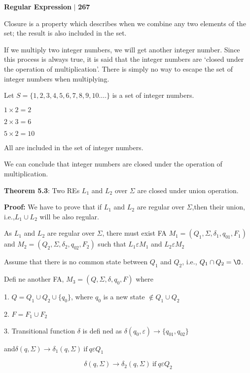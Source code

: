 \documentclass[10pt,a4paper]{book}
\begin{document}
\small

\begin{flushright}
  \textsf{\textbf{Regular Expression}} $|$ \textbf{\textsf{267}}
\end{flushright}

Closure is a property which describes when we combine any two elements of the set; the result is
also included in the set.

If we multiply two integer numbers, we will get another integer number. Since this process is always
true, it is said that the integer numbers are ‘closed under the operation of multiplication’. There is simply
no way to escape the set of integer numbers when multiplying.

Let $S = \{1,2,3,4,5,6,7,8,9,10….\}$ is a set of integer numbers.

$1 × 2 = 2$

$2 × 3 = 6$

$5 × 2 = 10$

All are included in the set of integer numbers.

We can conclude that integer numbers are closed under the operation of multiplication.

\begin{flushleft}
  \textbf{Theorem 5.3}: Two REs $L_{1}$ and $L_{2}$ over $\Sigma$ are closed under union operation.

  \textrm{\textbf{Proof:}} We have to prove that if $L_{1}$ and $L_{2}$ are regular over $\Sigma$,then their union, i.e.,$L_{1} \cup L_{2}$ will be also regular.

As $L_{1}$ and $L_{2}$ are regular over $\Sigma$, there must exist FA $ M_{1} = (Q_{1}, \Sigma, \delta_{1}, q_{01}, F_{1}) $ and $ M_{2} = (Q_{2}, \Sigma , \delta_{2},q_{02}, F_{2})$ such that $L_{1} \varepsilon M_{1}$ and $L_{2} \varepsilon M_{2}$

Assume that there is no common state between $Q_{1}$ and $Q_{2}$, i.e., $Q_{1} \cap Q_{2} = {\O}$.

Defi ne another FA, $M_{3} = (Q, \Sigma, \delta, q_{0}, F)$ where

1. $Q = Q_{1} \cup Q_{2} \cup \{q_{0}\}$, where $q_{0}$ is a new state $\notin Q_{1} \cup Q_{2}$

2. $F = F_{1} \cup F_{2}$

3. Transitional function $\delta$ is defi ned as $\delta (q_{0}, \varepsilon) \rightarrow \{q_{01}, q_{02}\}$

and\qquad\qquad\qquad\qquad\qquad $\delta(q, \Sigma) \rightarrow \delta_{1}(q, \Sigma) \:\textrm{if}\: q \varepsilon Q_{1}$

$$\delta(q, \Sigma) \rightarrow \delta_{2}(q, \Sigma) \:\textrm{if}\: q \varepsilon Q_{2}$$

\end{flushleft}
\end{document}

